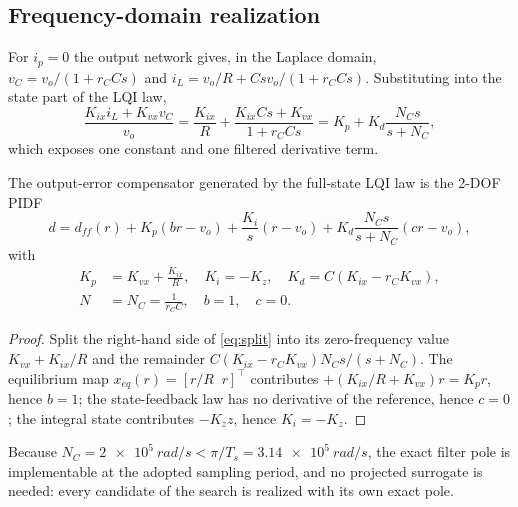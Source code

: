 \subsection{Frequency-domain realization}
For $i_p=0$ the output network gives, in the Laplace domain,
$v_C=v_o/(1+r_CCs)$ and $i_L=v_o/R+Csv_o/(1+r_CCs)$. Substituting into the state
part of the LQI law,
\begin{equation}
\frac{K_{ix}i_L+K_{vx}v_C}{v_o}=\frac{K_{ix}}{R}+\frac{K_{ix}Cs+K_{vx}}{1+r_CCs}
=K_p+K_d\frac{N_Cs}{s+N_C},
\label{eq:split}
\end{equation}
which exposes one constant and one filtered derivative term.

\begin{proposition}\label{prop:map}
The output-error compensator generated by the full-state LQI law is the 2-DOF
PIDF
\begin{equation}
d=d_{ff}(r)+K_p(br-v_o)+\frac{K_i}{s}(r-v_o)+K_d\frac{N_Cs}{s+N_C}(cr-v_o),
\label{eq:pidf}
\end{equation}
with
\begin{equation}
\begin{aligned}
K_p&=K_{vx}+\frac{K_{ix}}{R},\quad K_i=-K_z,\quad K_d=C(K_{ix}-r_CK_{vx}),\\
N&=N_C=\frac{1}{r_CC},\quad b=1,\quad c=0 .
\end{aligned}
\label{eq:map}
\end{equation}
\end{proposition}
\begin{proof}
Split the right-hand side of \eqref{eq:split} into its zero-frequency value
$K_{vx}+K_{ix}/R$ and the remainder $C(K_{ix}-r_CK_{vx})N_Cs/(s+N_C)$. The
equilibrium map $x_{eq}(r)=[r/R\;\;r]^\top$ contributes $+(K_{ix}/R+K_{vx})r=K_pr$,
hence $b=1$; the state-feedback law has no derivative of the reference, hence
$c=0$; the integral state contributes $-K_zz$, hence $K_i=-K_z$.
\end{proof}

Because $N_C=\SI{2e5}{rad/s}<\pi/T_s=\SI{3.14e5}{rad/s}$, the exact filter pole is
implementable at the adopted sampling period, and no projected surrogate is
needed: every candidate of the search is realized with its own exact pole.

